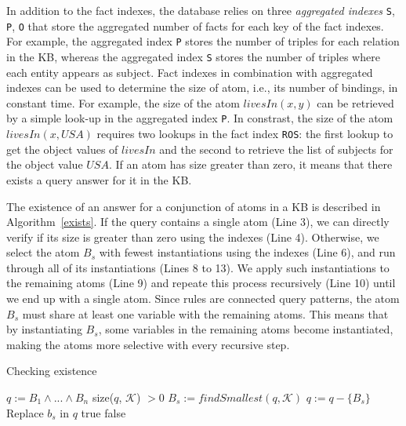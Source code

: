 In addition to the fact indexes, the database relies 
on three \emph{aggregated indexes} \texttt{S}, \texttt{P}, \texttt{O} that store the aggregated number of facts for each
key of the fact indexes. For example, the aggregated index \texttt{P} stores the number of triples for each relation
in the KB, whereas the aggregated index \texttt{S} stores the number of triples where each entity appears as subject. 
Fact indexes in combination with aggregated indexes can be used to determine the size of atom, i.e., its number of bindings, 
in constant time. For example, the size of the atom $livesIn(x,y)$ can be retrieved by a simple look-up 
in the aggregated index \texttt{P}. In constrast, the size of the atom $livesIn(x, USA)$ requires two 
lookups in the fact index \texttt{ROS}: the first lookup to get the object values of $livesIn$ and the second
to retrieve the list of subjects for the object value $USA$. If an atom has size greater than zero, it means
that there exists a query answer for it in the KB.

The existence of an answer for a conjunction of atoms in a KB is described in Algorithm~\ref{exists}. 
If the query contains a single atom (Line 3), we can directly verify if its size is greater than zero using
the indexes (Line 4). Otherwise, we select the atom $B_s$ with fewest instantiations using the indexes (Line 6), 
and run through all of its instantiations (Lines 8 to 13). We apply such instantiations to the remaining atoms (Line 9)
and repeate this process recursively (Line 10) until we end up with a single atom. Since rules are connected query patterns, the atom $B_s$ must share at least
one variable with the remaining atoms. This means that by instantiating $B_s$, some variables in the remaining atoms 
become instantiated, making the atoms more selective with every recursive step.

\begin{algorithm}
\caption{Checking existence}
\label{exists}
\begin{algorithmic}[1]
    \State $q := B_1 \wedge ... \wedge B_n$
      \State \Return size($q$, $\mathcal{K}$) $> 0$
    \Else
      \State $B_s := findSmallest(q, \mathcal{K})$
      \State $q := q - \{ B_s \} $
	\State Replace $b_s$ in $q$
	    \State \Return true
	  \EndIf
      \EndFor
    \EndIf
    \State \Return false
\EndFunction
\end{algorithmic}
\end{algorithm}

